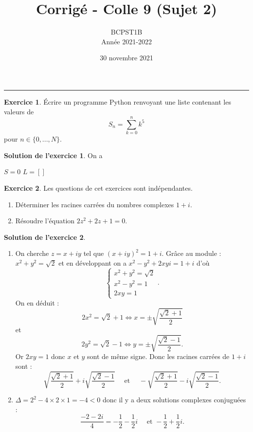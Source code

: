 \documentclass[a4paper, 11pt,openany]{article}%
\title{Corrigé - Colle 9 (Sujet 2)}
\author{BCPST1B\\
Année 2021-2022}
\date{30 novembre 2021}
\theoremstyle{plain}
\theoremstyle{definition}
\newtheorem{exo}{Exercice}
\newtheorem{sol}{Solution de l'exercice}
\theoremstyle{remark}
\begin{document}
   \maketitle
      \rule{\linewidth}{0.5mm}


\begin{exo}
Écrire un programme Python renvoyant une liste contenant les valeurs de
\[ S_n = \sum_{k=0}^{n} k^5\]
pour $n \in \{0,...,N\}$.
\end{exo}

\begin{sol}
On a
\begin{center}
\begin{algorithm}
$S =0$ \;
$L = []$ \;
\caption{Calcul de $S_n$}
\end{algorithm}
\end{center}
\end{sol}


\begin{exo}
Les questions de cet exercices sont indépendantes.
\begin{enumerate}
\item Déterminer les racines carrées du nombres complexes $1+i$.
\item Résoudre l'équation $2z^2+2z+1=0$.
\end{enumerate}
\end{exo}

\begin{sol}
\begin{enumerate}
\item  On cherche $z=x+iy$ tel que $(x+iy)^2=1+i$.
Grâce au module : $x^2+y^2=\sqrt2$ et en développant on a $x^2-y^2+2xyi=1+i$ d'où $$\begin{cases}x^2+y^2=\sqrt2 \\ x^2-y^2=1 \\ 2xy=1\end{cases}.$$
On en déduit : $$2x^2=\sqrt2+1 \Leftrightarrow x=\pm \sqrt{\frac{\sqrt2 +1}{2}}$$ et $$2y^2=\sqrt2-1 \Leftrightarrow y = \pm \sqrt{\frac{\sqrt2-1}{2}}.$$
Or $2xy=1$ donc $x$ et $y$ sont de même signe. Donc les racines carrées de $1+i$ sont : 
$$\sqrt{\frac{\sqrt2 +1}{2}} + i \sqrt{\frac{\sqrt2 -1}{2}} \quad \text{ et } \quad -\sqrt{\frac{\sqrt2 +1}{2}} - i \sqrt{\frac{\sqrt2 -1}{2}}.$$
  \item $\Delta= 2^2-4\times2\times1=-4<0$ donc il y a deux solutions complexes conjuguées : $$\frac{-2-2i}{4}=-\frac12-\frac12i \quad \text{ et } -\frac12+\frac12i.$$
\end{enumerate}
\end{sol}
\end{document}
